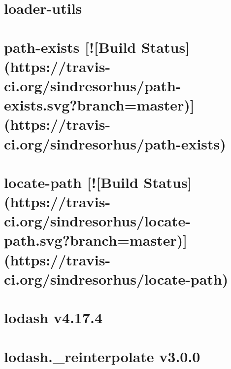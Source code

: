 \documentclass[twoside]{book}
\newcommand{\+}{\discretionary{\mbox{\scriptsize$\hookleftarrow$}}{}{}}
\begin{document}
\chapter{loader-\/utils}
\label{md__c_1_workspace_demo_src_main_script_node_modules_loader-utils__r_e_a_d_m_e}

\chapter{path-\/exists \mbox{[}!\mbox{[}Build Status\mbox{]}(https\+://travis-\/ci.org/sindresorhus/path-\/exists.svg?branch=master)\mbox{]}(https\+://travis-\/ci.org/sindresorhus/path-\/exists)}
\label{md__c_1_workspace_demo_src_main_script_node_modules_locate-path_node_modules_path-exists_readme}

\chapter{locate-\/path \mbox{[}!\mbox{[}Build Status\mbox{]}(https\+://travis-\/ci.org/sindresorhus/locate-\/path.svg?branch=master)\mbox{]}(https\+://travis-\/ci.org/sindresorhus/locate-\/path)}
\label{md__c_1_workspace_demo_src_main_script_node_modules_locate-path_readme}

\chapter{lodash v4.17.4}
\label{md__c_1_workspace_demo_src_main_script_node_modules_lodash__r_e_a_d_m_e}

\chapter{lodash.\+\_\+reinterpolate v3.0.0}
\label{md__c_1_workspace_demo_src_main_script_node_modules_lodash_8_reinterpolate__r_e_a_d_m_e}

\end{document}
